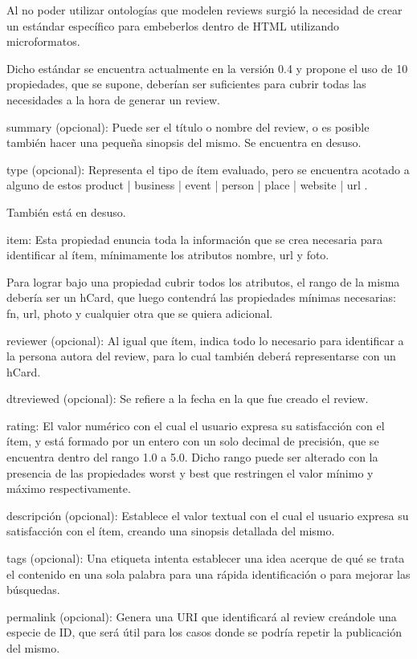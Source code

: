 Al no poder utilizar ontologías que modelen reviews surgió la necesidad de crear un estándar específico para embeberlos dentro de HTML 
utilizando microformatos.

Dicho estándar se encuentra actualmente en la versión 0.4 y propone el uso de 10 propiedades, que se supone, deberían ser 
suficientes para cubrir todas las necesidades a la hora de generar un review.

summary (opcional): Puede ser el título o nombre del review, o es posible también hacer una pequeña sinopsis del mismo. Se encuentra en desuso.

type (opcional): Representa el tipo de ítem evaluado, pero se encuentra acotado a alguno de estos  product | business | event | person | place | website | url .


También está en desuso.

item: Esta propiedad enuncia toda la información que se crea necesaria para identificar al ítem, mínimamente los atributos nombre, url y foto.


Para lograr bajo una propiedad cubrir todos los atributos, el rango de la misma debería ser un hCard, que luego contendrá las propiedades mínimas necesarias: 
fn, url, photo y cualquier otra que se quiera adicional.

reviewer (opcional): Al igual que ítem, indica todo lo necesario para identificar a la persona autora del review, para lo cual también deberá representarse 
con un hCard. 

dtreviewed (opcional): Se refiere a la fecha en la que fue creado el review. 

rating: El valor numérico con el cual el usuario expresa su satisfacción con el ítem, y está formado por un entero con un solo decimal 
de precisión, que se encuentra dentro del rango 1.0 a 5.0. Dicho rango puede ser alterado con la presencia de las propiedades worst y best 
que restringen el valor mínimo y máximo respectivamente.

descripción (opcional): Establece el valor textual con el cual el usuario expresa su satisfacción con el ítem, creando una 
sinopsis detallada del mismo. 

tags (opcional): Una etiqueta intenta establecer una idea acerque de qué se trata el contenido en una sola palabra para una rápida identificación 
o para mejorar las búsquedas. 

permalink (opcional): Genera una URI que identificará al review creándole una especie de ID, que será útil para los casos donde 
se podría repetir la publicación del mismo. 

